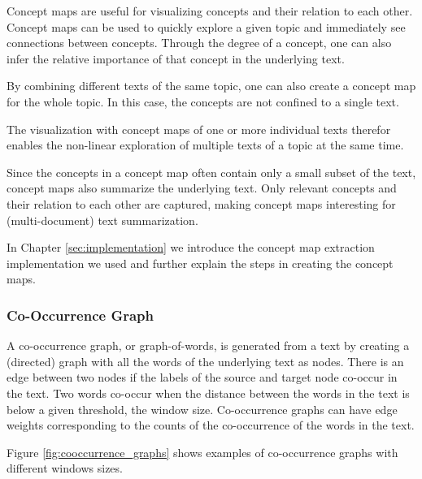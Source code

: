 Concept maps are useful for visualizing concepts and their relation to each other.
Concept maps can be used to quickly explore a given topic and immediately see connections between concepts.
Through the degree of a concept, one can also infer the relative importance of that concept in the underlying text.

By combining different texts of the same topic, one can also create a concept map for the whole topic.
In this case, the concepts are not confined to a single text.

The visualization with concept maps of one or more individual texts therefor enables the non-linear exploration of multiple texts of a topic at the same time.

Since the concepts in a concept map often contain only a small subset of the text, concept maps also summarize the underlying text.
Only relevant concepts and their relation to each other are captured, making concept maps interesting for (multi-document) text summarization.

In Chapter \ref{sec:implementation} we introduce the concept map extraction implementation we used and further explain the steps in creating the concept maps.

\subsubsection{Co-Occurrence Graph}
A co-occurrence graph, or graph-of-words, is generated from a text by creating a (directed) graph with all the words of the underlying text as nodes.
There is an edge between two nodes if the labels of the source and target node co-occur in the text.
Two words co-occur when the distance between the words in the text is below a given threshold, the window size.
Co-occurrence graphs can have edge weights corresponding to the counts of the co-occurrence of the words in the text.

Figure \ref{fig:cooccurrence_graphs} shows examples of co-occurrence graphs with different windows sizes.

